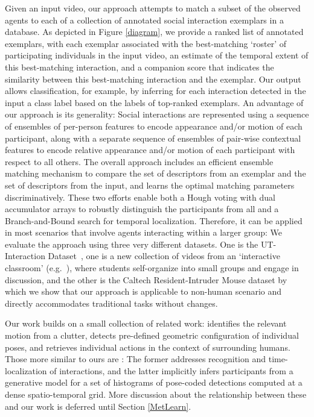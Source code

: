 Given an input video, our approach attempts to match a subset of the observed agents to each of a collection of annotated social interaction exemplars in a database. As depicted in Figure \ref{diagram}, we provide a ranked list of annotated exemplars, with each exemplar associated with the best-matching `roster' of participating individuals in the input video, an estimate of the temporal extent of this best-matching interaction, and a companion score that indicates the similarity between this best-matching interaction and the exemplar. Our output allows classification, for example, by inferring for each interaction detected in the input a class label based on the labels of top-ranked exemplars. An advantage of our approach is its generality: Social interactions are represented using a sequence of ensembles of per-person features to encode appearance and/or motion of each participant, along with a separate sequence of ensembles of pair-wise contextual features to encode relative appearance and/or motion of each participant with respect to all others. The overall approach includes an efficient ensemble matching mechanism to compare the set of descriptors from an exemplar and the set of descriptors from the input, and learns the optimal matching parameters discriminatively. These two efforts enable both a Hough voting with dual accumulator arrays to robustly distinguish the participants from all and a Branch-and-Bound search for temporal localization. Therefore, it can be applied in most scenarios that involve agents interacting within a larger group: We evaluate the approach using three very different datasets. One is the UT-Interaction Dataset~\cite{Ryoo:group}, one is a new collection of videos from an `interactive classroom' (e.g.~\cite{Crouch:PI}), where students self-organize into small groups and engage in discussion, and the other is the Caltech Resident-Intruder Mouse dataset \cite{CRIM13} by which we show that our approach is applicable to non-human scenario and directly accommodates traditional tasks without changes.

Our work builds on a small collection of related work: \cite{Li:segmentation} identifies the relevant motion from a clutter, \cite{Cristani:discovery} detects pre-defined geometric configuration of individual poses, and \cite{Lan:retrieval} retrieves individual actions in the context of surrounding humans. Those more similar to ours are \cite{Ryoo:group,Amer:group}: The former addresses recognition and time-localization of interactions, and the latter implicitly infers participants from a generative model for a set of histograms of pose-coded detections computed at a dense spatio-temporal grid. More discussion about the relationship between these and our work is deferred until Section \ref{MetLearn}.